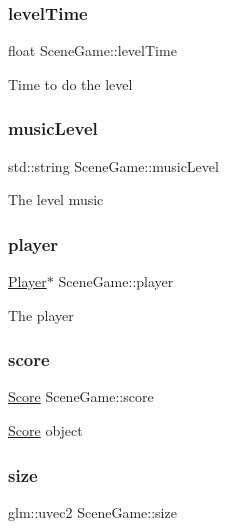 \subsubsection{\texorpdfstring{level\+Time}{levelTime}}
{\footnotesize\ttfamily float Scene\+Game\+::level\+Time}

Time to do the level \mbox{\label{class_scene_game_a725aea97a7eb7b1ee4ea7808fff9c948}} 
\subsubsection{\texorpdfstring{music\+Level}{musicLevel}}
{\footnotesize\ttfamily std\+::string Scene\+Game\+::music\+Level}

The level music \mbox{\label{class_scene_game_a7343447f840c96da20f2358c035b7ce4}} 
\subsubsection{\texorpdfstring{player}{player}}
{\footnotesize\ttfamily \hyperlink{class_player}{Player}$\ast$ Scene\+Game\+::player}

The player \mbox{\label{class_scene_game_ae548cebf05f9ca19eadf0e2c166c8ab4}} 
\subsubsection{\texorpdfstring{score}{score}}
{\footnotesize\ttfamily \hyperlink{class_score}{Score} Scene\+Game\+::score}

\hyperlink{class_score}{Score} object \mbox{\label{class_scene_game_a3cf109ade202cfa93be0778d9218ef14}} 
\subsubsection{\texorpdfstring{size}{size}}
{\footnotesize\ttfamily glm\+::uvec2 Scene\+Game\+::size}

